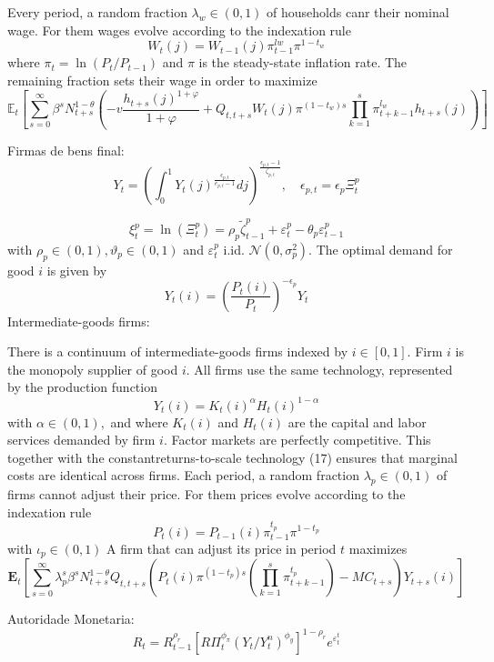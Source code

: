 Every period, a random fraction $\lambda_{w} \in(0,1)$ of households canr their nominal wage. For them wages evolve according to the indexation rule
$$
W_{t}(j)=W_{t-1}(j) \pi_{t-1}^{l w} \pi^{1-t_{w}}
$$
where $\pi_{t}=\ln \left(P_{t} / P_{t-1}\right)$ and $\pi$ is the steady-state inflation rate. The remaining fraction sets their wage in order to maximize
$$
\mathbb{E}_{t}\left[\sum_{s=0}^{\infty} \beta^{s} N_{t+s}^{1-\theta}\left(-v \frac{h_{t+s}(j)^{1+\varphi}}{1+\varphi}+Q_{t, t+s} W_{t}(j) \pi^{\left(1-t_{w}\right) s} \prod_{k=1}^{s} \pi_{t+k-1}^{l_{w}} h_{t+s}(j)\right)\right]
$$

Firmas de bens final:
$$
Y_{t}=\left(\int_{0}^{1} Y_{t}(j)^{\frac{\epsilon_{p, t}}{e_{p, t}-1}} d j\right)^{\frac{\epsilon_{p, t}-1}{\zeta_{p, t}}}, \quad \epsilon_{p, t}=\epsilon_{p} \Xi_{t}^{p}
$$

$$
\xi_{t}^{p}=\ln \left(\Xi_{t}^{p}\right)=\rho_{p} \tilde{\zeta}_{t-1}^{p}+\varepsilon_{t}^{p}-\theta_{p} \varepsilon_{t-1}^{p}
$$
with $\rho_{p} \in(0,1), \vartheta_{p} \in(0,1)$ and $\varepsilon_{t}^{p}$ i.id. $\mathcal{N}\left(0, \sigma_{p}^{2}\right) .$ The optimal demand for good $i$ is given by
$$
Y_{t}(i)=\left(\frac{P_{t}(i)}{P_{t}}\right)^{-\epsilon_{p}} Y_{t}
$$
Intermediate-goods firms:

There is a continuum of intermediate-goods firms indexed by $i \in[0,1] .$ Firm $i$ is the monopoly supplier of good $i .$ All firms use the same technology, represented by the production function
$$
Y_{t}(i)=K_{t}(i)^{\alpha} H_{t}(i)^{1-\alpha}
$$
with $\alpha \in(0,1),$ and where $K_{t}(i)$ and $H_{t}(i)$ are the capital and labor services demanded by firm $i .$ Factor markets are perfectly competitive. This together with the constantreturns-to-scale technology (17) ensures that marginal costs are identical across firms. Each period, a random fraction $\lambda_{p} \in(0,1)$ of firms cannot adjust their price. For them prices evolve according to the indexation rule
$$
P_{t}(i)=P_{t-1}(i) \pi_{t-1}^{t_{p}} \pi^{1-t_{p}}
$$
with $\iota_{p} \in(0,1)$
A firm that can adjust its price in period $t$ maximizes
$$
\mathbf{E}_{t}\left[\sum_{s=0}^{\infty} \lambda_{p}^{s} \beta^{s} N_{t+s}^{1-\theta} Q_{t, t+s}\left(P_{t}(i) \pi^{\left(1-t_{p}\right) s}\left(\prod_{k=1}^{s} \pi_{t+k-1}^{t_{p}}\right)-M C_{t+s}\right) Y_{t+s}(i)\right]
$$

Autoridade Monetaria:
$$
R_{t}=R_{t-1}^{\rho_{r}}\left[R \Pi_{t}^{\phi_{\pi}}\left(Y_{t} / Y_{t}^{n}\right)^{\phi_{y}}\right]^{1-\rho_{r}} e^{\varepsilon_{t}^{t}}
$$


